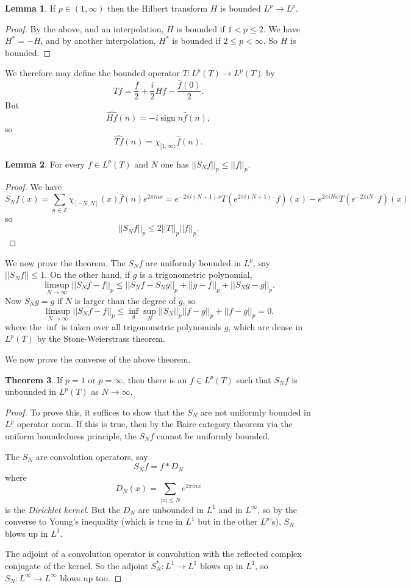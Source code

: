 \documentclass[12pt]{report}
\newcommand{\ZZ}{\mathbb{Z}}
\DeclareMathOperator*{\sgn}{sign}
\newcommand{\dfn}[1]{\emph{#1}\index{#1}}
\theoremstyle{definition}
\newtheorem{theorem}{Theorem}[chapter]
\newtheorem{lemma}[theorem]{Lemma}
\begin{document}
\begin{lemma}
If $p \in (1, \infty)$ then the Hilbert transform $H$ is bounded $L^p \to L^p$.
\end{lemma}
\begin{proof}
By the above, and an interpolation, $H$ is bounded if $1 < p \leq 2$.
We have $H^* = -H$, and by another interpolation, $H^*$ is bounded if $2 \leq p < \infty$. So $H$ is bounded.
\end{proof}
We therefore may define the bounded operator $T: L^p(T) \to L^p(T)$ by
$$Tf = \frac{f}{2} + \frac{i}{2}Hf - \frac{\hat f(0)}{2}.$$
But
$$\widehat{Hf}(n) = -i\sgn n\hat f(n),$$
so
$$\widehat{Tf}(n) = \chi_{[1, \infty)} \hat f(n).$$

\begin{lemma}
For every $f \in L^p(T)$ and $N$ one has $||S_Nf||_p \leq ||f||_p$.
\end{lemma}
\begin{proof}
We have
$$S_Nf(x) = \sum_{n \in \ZZ} \chi_{[-N, N]}(x) \hat f(n) e^{2\pi inx} = e^{-2\pi i(N+1)x}T(e^{2\pi i(N+1)\cdot }f)(x) - e^{2\pi iNx}T(e^{-2\pi iN\cdot}f)(x)$$
so
$$||S_Nf||_p \leq 2 ||T||_p ||f||_p.$$
\end{proof}
We now prove the theorem. The $S_Nf$ are uniformly bounded in $L^p$, say $||S_Nf|| \leq 1$. On the other hand, if $g$ is a trigonometric polynomial,
$$\limsup_{N \to \infty} ||S_Nf - f||_p \leq ||S_Nf - S_Ng||_p + ||g - f||_p + ||S_Ng - g||_p.$$
Now $S_Ng = g$ if $N$ is larger than the degree of $g$, so
$$\limsup_{N \to \infty} ||S_Nf - f||_p \leq \inf_g \sup_N ||S_N||_p||f - g||_p + ||f - g||_p = 0.$$
where the $\inf$ is taken over all trigonometric polynomials $g$, which are dense in $L^p(T)$ by the Stone-Weierstrass theorem.

We now prove the converse of the above theorem.
\begin{theorem}
If $p = 1$ or $p = \infty$, then there is an $f \in L^p(T)$ such that $S_Nf$ is unbounded in $L^p(T)$ as $N \to \infty$.
\end{theorem}
\begin{proof}
To prove this, it suffices to show that the $S_N$ are not uniformly bounded in $L^p$ operator norm.
If this is true, then by the Baire category theorem via the uniform boundedness principle, the $S_Nf$ cannot be uniformly bounded.

The $S_N$ are convolution operators, say
$$S_Nf = f * D_N$$
where
$$D_N(x) = \sum_{|n| \leq N} e^{2\pi inx}$$
is the \dfn{Dirichlet kernel}. But the $D_N$ are unbounded in $L^1$ and in $L^\infty$, so by the converse to Young's inequality (which is true in $L^1$ but in the other $L^p$'s), $S_N$ blows up in $L^1$.

The adjoint of a convolution operator is convolution with the reflected complex conjugate of the kernel. So the adjoint $S_N^*: L^1 \to L^1$ blows up in $L^1$, so $S_N: L^\infty \to L^\infty$ blows up too.
\end{proof}
\end{document}
